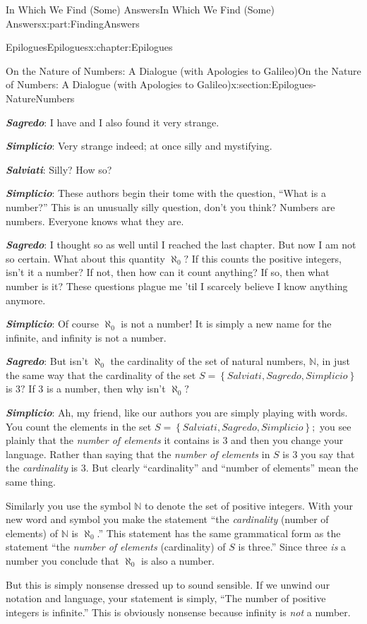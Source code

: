 \documentclass[oneside,10pt,]{book}
\newcommand{\alert}[1]{\textbf{\textit{#1}}}
\numberwithin{equation}{section}
\newcommand{\NN}{\mathbb {N}}
\begin{document}
\begin{partptx}{In Which We Find (Some) Answers}{}{In Which We Find (Some) Answers}{}{}{x:part:FindingAnswers}
\begin{chapterptx}{Epilogues}{}{Epilogues}{}{}{x:chapter:Epilogues}
\begin{sectionptx}{On the Nature of Numbers: A Dialogue (with Apologies to Galileo)}{}{On the Nature of Numbers: A Dialogue (with Apologies to Galileo)}{}{}{x:section:Epilogues-NatureNumbers}
\begin{introduction}{}
\alert{Sagredo}: I have and I also found it very strange.%
\par
\alert{Simplicio}: Very strange indeed; at once silly and mystifying.%
\par
\alert{Salviati}: Silly? How so?%
\par
\alert{Simplicio}: These authors begin their tome with the question, ``What is a number?'' This is an unusually silly question, don't you think? Numbers are numbers. Everyone knows what they are.%
\par
\alert{Sagredo}: I thought so as well until I reached the last chapter. But now I am not so certain. What about this quantity \(\aleph_0?\) If this counts the positive integers, isn't it a number? If not, then how can it count anything? If so, then what number is it? These questions plague me 'til I scarcely believe I know anything anymore.%
\par
\alert{Simplicio}: Of course \(\aleph_0\) is not a number! It is simply a new name for the infinite, and infinity is not a number.%
\par
\alert{Sagredo}: But isn't \(\aleph_0\) the cardinality of the set of natural numbers, \(\NN\), in just the same way that the cardinality of the set \(S=\left\{Salviati, Sagredo, Simplicio\right\}\) is \(3?\) If \(3\) is a number, then why isn't \(\aleph_0?\)%
\par
\alert{Simplicio}: Ah, my friend, like our authors you are simply playing with words. You count the elements in the set \(S=\left\{Salviati, Sagredo, Simplicio\right\};\) you see plainly that the \emph{number of elements} it contains is \(3\) and then you change your language. Rather than saying that the \emph{number of elements} in \(S\) is \(3\) you say that the \emph{cardinality} is \(3\). But clearly ``cardinality'' and ``number of elements'' mean the same thing.%
\par
Similarly you use the symbol \(\NN\) to denote the set of positive integers. With your new word and symbol you make the statement ``the \emph{cardinality} (number of elements) of \(\NN\) is \(\aleph_0\).'' This statement has the same grammatical form as the statement ``the \emph{number of elements} (cardinality) of \(S\) is three.'' Since three \emph{is} a number you conclude that \(\aleph_0\) is also a number.%
\par
But this is simply nonsense dressed up to sound sensible. If we unwind our notation and language, your statement is simply, ``The number of positive integers is infinite.'' This is obviously nonsense because infinity is \emph{not} a number.%

\end{introduction}
\end{sectionptx}
\end{chapterptx}
\end{partptx}
\end{document}
